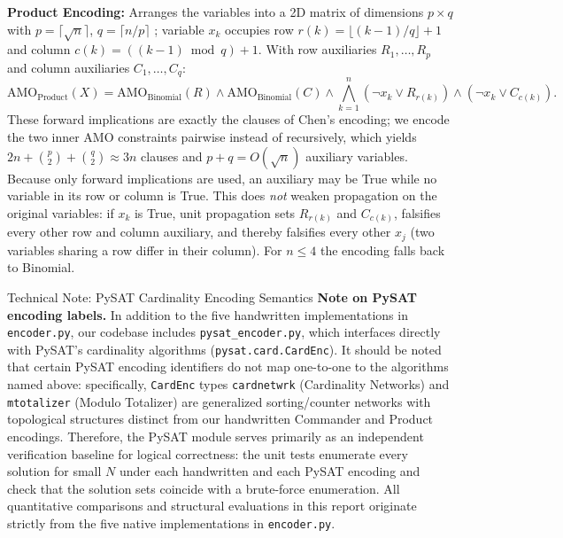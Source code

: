 \documentclass[a4paper,fleqn]{cas-sc}
\begin{document}
\textbf{Product Encoding:} Arranges the variables into a 2D matrix of dimensions $p \times q$ with $p = \lceil\sqrt{n}\rceil$, $q = \lceil n/p \rceil$ \cite{chen2010new}; variable $x_k$ occupies row $r(k) = \lfloor (k-1)/q \rfloor + 1$ and column $c(k) = ((k-1) \bmod q) + 1$. With row auxiliaries $R_1, \dots, R_p$ and column auxiliaries $C_1, \dots, C_q$:
\begin{equation}
    \mathrm{AMO}_{\text{Product}}(X) = \mathrm{AMO}_{\text{Binomial}}(R) \wedge \mathrm{AMO}_{\text{Binomial}}(C) \wedge \bigwedge_{k=1}^{n} \left(\neg x_k \vee R_{r(k)}\right) \wedge \left(\neg x_k \vee C_{c(k)}\right).
\end{equation}
These forward implications are exactly the clauses of Chen's encoding; we encode the two inner AMO constraints pairwise instead of recursively, which yields $2n + \binom{p}{2} + \binom{q}{2} \approx 3n$ clauses and $p + q = O(\sqrt{n})$ auxiliary variables. Because only forward implications are used, an auxiliary may be True while no variable in its row or column is True. This does \emph{not} weaken propagation on the original variables: if $x_k$ is True, unit propagation sets $R_{r(k)}$ and $C_{c(k)}$, falsifies every other row and column auxiliary, and thereby falsifies every other $x_j$ (two variables sharing a row differ in their column). For $n \leq 4$ the encoding falls back to Binomial.

\begin{notebox}{Technical Note: PySAT Cardinality Encoding Semantics}
\textbf{Note on PySAT encoding labels.} In addition to the five handwritten implementations in \texttt{encoder.py}, our codebase includes \texttt{pysat\_encoder.py}, which interfaces directly with PySAT's cardinality algorithms (\texttt{pysat.card.CardEnc}). It should be noted that certain PySAT encoding identifiers do not map one-to-one to the algorithms named above: specifically, \texttt{CardEnc} types \texttt{cardnetwrk} (Cardinality Networks) and \texttt{mtotalizer} (Modulo Totalizer) are generalized sorting/counter networks with topological structures distinct from our handwritten Commander and Product encodings. Therefore, the PySAT module serves primarily as an independent verification baseline for logical correctness: the unit tests enumerate every solution for small $N$ under each handwritten and each PySAT encoding and check that the solution sets coincide with a brute-force enumeration. All quantitative comparisons and structural evaluations in this report originate strictly from the five native implementations in \texttt{encoder.py}.
\end{notebox}
\end{document}
